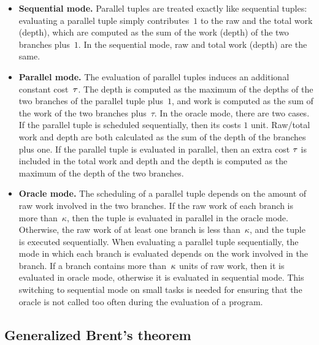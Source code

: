 \begin{itemize}

\item \textbf{Sequential mode.} Parallel tuples are treated exactly
  like sequential tuples: evaluating a parallel tuple simply
  contributes~$1$ to the raw and the total work (depth), which are
  computed as the sum of the work (depth) of the two branches
  plus~$1$.  In the sequential mode, raw and total work (depth) are
  the same.


\item \textbf{Parallel mode.} The evaluation of parallel tuples induces
  an additional constant cost~${\tau}$. The depth is computed as the
  maximum of the depths of the two branches of the parallel tuple
  plus~$1$, and work is computed as the sum of the work of the two
  branches plus~$\tau$. In the oracle mode, there are two cases.  If
  the parallel tuple is scheduled sequentially, then its costs $1$
  unit.  Raw/total work and depth are both calculated as the sum of
  the depth of the branches plus one.  If the parallel tuple is
  evaluated in parallel, then an extra cost ${\tau}$ is included in the
  total work and depth and the depth is computed as the maximum of the
  depth of the two branches.

\item \textbf{Oracle mode.} The scheduling of a parallel tuple depends
  on the amount of raw work involved in the two branches.  If the raw
  work of each branch is more than~$\kappa$, then the tuple is
  evaluated in parallel in the oracle mode.  Otherwise, the raw work
  of at least one branch is less than~$\kappa$, and the tuple is
  executed sequentially.  When evaluating a parallel tuple
  sequentially, the mode in which each branch is evaluated depends on
  the work involved in the branch.  If a branch contains more
  than~${\kappa}$ units of raw work, then it is evaluated in  oracle
  mode, otherwise it is evaluated in  sequential mode.  This
  switching to sequential mode on small tasks is needed for ensuring
  that the oracle is not called too often during the evaluation of a
  program.
\end{itemize}


\subsection{Generalized Brent's theorem}

